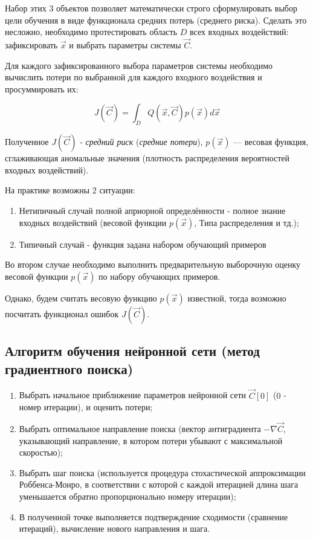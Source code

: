 \documentclass{article}
\numberwithin{equation}{subsection}
\begin{document}
Набор этих 3 объектов позволяет математически строго сформулировать выбор цели обучения 
в виде функционала средних потерь (среднего риска).
Сделать это несложно, необходимо протестировать область $D$ всех входных воздействий: 
зафиксировать $\vec{x}$ и выбрать параметры системы $\vec{C}$. 

Для каждого зафиксированного выбора параметров системы необходимо вычислить 
потери по выбранной для каждого входного воздействия и просуммировать их:

\begin{equation}
    J(\vec{C}) = \int_{D} Q(\vec{x}, \vec{C}) p(\vec{x}) d\vec{x}
    \label{eq:avg_risk}
\end{equation}

Полученное $J(\vec{C})$ - \textit{средний риск} (\textit{средние потери}), $p(\vec{x})$ --- 
весовая функция, сглаживающая аномальные значения (плотность распределения вероятностей 
входных воздействий).

На практике возможны 2 ситуации:
\begin{enumerate}
    \item Нетипичный случай полной априорной определённости - полное знание входных 
    воздействий (весовой функции $p(\vec{x})$, Типа распределения и тд.);
    \item Типичный случай - функция задана набором обучающий примеров
\end{enumerate}

Во втором случае необходимо выполнить предварительную выборочную оценку весовой функции 
$p(\vec{x})$ по набору обучающих примеров.

Однако, будем считать весовую функцию $p(\vec{x})$ известной, тогда возможно посчитать функционал 
ошибок $J(\vec{C})$.

\subsection{Алгоритм обучения нейронной сети (метод градиентного поиска)}
\begin{enumerate}
    \item Выбрать начальное приближение параметров нейронной сети $\vec{C}[0]$ 
    ($0$ - номер итерации), и оценить потери;
    \item Выбрать оптимальное направление поиска (вектор антиградиента 
    $-\nabla\vec{C}$, указывающий направление, в котором потери убывают 
    с максимальной скоростью);
    \item Выбрать шаг поиска (используется процедура стохастической 
    аппроксимации Роббенса-Монро, в соответствии с которой с каждой 
    итерацией длина шага уменьшается обратно пропорционально номеру итерации);
    \item[] В полученной точке выполняется подтверждение сходимости 
    (сравнение итераций), вычисление нового направления и шага.
    \label{en:alg}
\end{enumerate}
\end{document}
